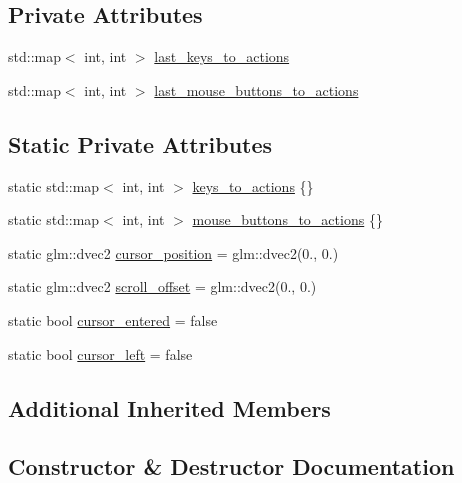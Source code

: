 \subsection*{Private Attributes}
\begin{DoxyCompactItemize}
\item 
std\+::map$<$ int, int $>$ \hyperlink{class_input_1_1_input_system_a7975b0aa6e26934e4676adc7eddb7afe}{last\+\_\+keys\+\_\+to\+\_\+actions}
\item 
std\+::map$<$ int, int $>$ \hyperlink{class_input_1_1_input_system_a114e8f05ef3fa1dfb9bc7846110a17df}{last\+\_\+mouse\+\_\+buttons\+\_\+to\+\_\+actions}
\end{DoxyCompactItemize}
\subsection*{Static Private Attributes}
\begin{DoxyCompactItemize}
\item 
static std\+::map$<$ int, int $>$ \hyperlink{class_input_1_1_input_system_a95d4a156b1576e4a79290d3d3f404515}{keys\+\_\+to\+\_\+actions} \{\}
\item 
static std\+::map$<$ int, int $>$ \hyperlink{class_input_1_1_input_system_aef7be617b0a51e5fbd854100212438c8}{mouse\+\_\+buttons\+\_\+to\+\_\+actions} \{\}
\item 
static glm\+::dvec2 \hyperlink{class_input_1_1_input_system_acc7d0415600059d9cc427a7734b59190}{cursor\+\_\+position} = glm\+::dvec2(0., 0.)
\item 
static glm\+::dvec2 \hyperlink{class_input_1_1_input_system_a7d9b7ce763b48a16d3feff0c93a14428}{scroll\+\_\+offset} = glm\+::dvec2(0., 0.)
\item 
static bool \hyperlink{class_input_1_1_input_system_a35b0b0ab2ba2e21c1b0f177a6c78a130}{cursor\+\_\+entered} = false
\item 
static bool \hyperlink{class_input_1_1_input_system_a4206748c9f2535838f63e393f9859739}{cursor\+\_\+left} = false
\end{DoxyCompactItemize}
\subsection*{Additional Inherited Members}


\subsection{Constructor \& Destructor Documentation}
\hypertarget{class_input_1_1_input_system_aa754c4c6a976f808004a93dbcfcdb39e}{}
